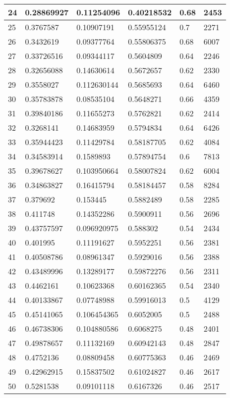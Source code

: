 \begin{longtable}{|l|l|l|l|l|l|}
24 & 0.28869927 & 0.11254096 & 0.40218532 & 0.68 & 2453 \\ \hline 
25 & 0.3767587 & 0.10907191 & 0.55955124 & 0.7 & 2271 \\ \hline 
26 & 0.3432619 & 0.09377764 & 0.55806375 & 0.68 & 6007 \\ \hline 
27 & 0.33726516 & 0.09344117 & 0.5604809 & 0.64 & 2246 \\ \hline 
28 & 0.32656088 & 0.14630614 & 0.5672657 & 0.62 & 2330 \\ \hline 
29 & 0.3558027 & 0.112630144 & 0.5685693 & 0.64 & 6460 \\ \hline 
30 & 0.35783878 & 0.08535104 & 0.5648271 & 0.66 & 4359 \\ \hline 
31 & 0.39840186 & 0.11655273 & 0.5762821 & 0.62 & 2414 \\ \hline 
32 & 0.3268141 & 0.14683959 & 0.5794834 & 0.64 & 6426 \\ \hline 
33 & 0.35944423 & 0.11429784 & 0.58187705 & 0.62 & 4084 \\ \hline 
34 & 0.34583914 & 0.1589893 & 0.57894754 & 0.6 & 7813 \\ \hline 
35 & 0.39678627 & 0.103950664 & 0.58007824 & 0.62 & 6004 \\ \hline 
36 & 0.34863827 & 0.16415794 & 0.58184457 & 0.58 & 8284 \\ \hline 
37 & 0.379692 & 0.153445 & 0.5882489 & 0.58 & 2285 \\ \hline 
38 & 0.411748 & 0.14352286 & 0.5900911 & 0.56 & 2696 \\ \hline 
39 & 0.43757597 & 0.096920975 & 0.588302 & 0.54 & 2434 \\ \hline 
40 & 0.401995 & 0.11191627 & 0.5952251 & 0.56 & 2381 \\ \hline 
41 & 0.40508786 & 0.08961347 & 0.5929016 & 0.56 & 2388 \\ \hline 
42 & 0.43489996 & 0.13289177 & 0.59872276 & 0.56 & 2311 \\ \hline 
43 & 0.4462161 & 0.10623368 & 0.60162365 & 0.54 & 2340 \\ \hline 
44 & 0.40133867 & 0.07748988 & 0.59916013 & 0.5 & 4129 \\ \hline 
45 & 0.45141065 & 0.106454365 & 0.6052005 & 0.5 & 2488 \\ \hline 
46 & 0.46738306 & 0.104880586 & 0.6068275 & 0.48 & 2401 \\ \hline 
47 & 0.49878657 & 0.11132169 & 0.60942143 & 0.48 & 2847 \\ \hline 
48 & 0.4752136 & 0.08809458 & 0.60775363 & 0.46 & 2469 \\ \hline 
49 & 0.42962915 & 0.15837502 & 0.61024827 & 0.46 & 2617 \\ \hline 
50 & 0.5281538 & 0.09101118 & 0.6167326 & 0.46 & 2517 \\ \hline 
\end{longtable}